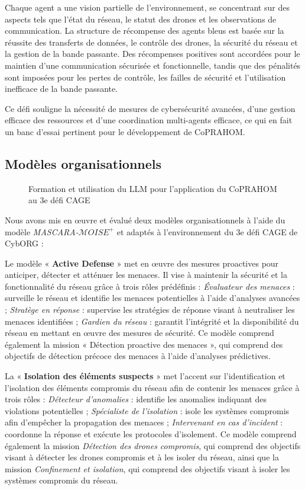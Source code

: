 Chaque agent a une vision partielle de l'environnement, se concentrant sur des aspects tels que l'état du réseau, le statut des drones et les observations de communication. La structure de récompense des agents bleus est basée sur la réussite des transferts de données, le contrôle des drones, la sécurité du réseau et la gestion de la bande passante. Des récompenses positives sont accordées pour le maintien d'une communication sécurisée et fonctionnelle, tandis que des pénalités sont imposées pour les pertes de contrôle, les failles de sécurité et l'utilisation inefficace de la bande passante.

Ce défi souligne la nécessité de mesures de cybersécurité avancées, d'une gestion efficace des ressources et d'une coordination multi-agents efficace, ce qui en fait un banc d'essai pertinent pour le développement de CoPRAHOM.

\subsection{Modèles organisationnels}

\begin{figure}[h!]
    \centering
    
    \caption{Formation et utilisation du LLM pour l'application du CoPRAHOM au 3e défi CAGE}\label{fig:llm_process}
\end{figure}


Nous avons mis en œuvre et évalué deux modèles organisationnels à l'aide du modèle \textit{MASCARA-$\mathcal{M}OISE^+$} et adaptés à l'environnement du 3e défi CAGE de CybORG :

Le modèle « \textbf{Active Defense} » met en œuvre des mesures proactives pour anticiper, détecter et atténuer les menaces. Il vise à maintenir la sécurité et la fonctionnalité du réseau grâce à trois rôles prédéfinis :
%
\textit{Évaluateur des menaces} : surveille le réseau et identifie les menaces potentielles à l'aide d'analyses avancées ;
\textit{Stratège en réponse} : supervise les stratégies de réponse visant à neutraliser les menaces identifiées ;
\textit{Gardien du réseau} : garantit l'intégrité et la disponibilité du réseau en mettant en œuvre des mesures de sécurité.
%
Ce modèle comprend également la mission « Détection proactive des menaces », qui comprend des objectifs de détection précoce des menaces à l'aide d'analyses prédictives.

La « \textbf{Isolation des éléments suspects} » met l'accent sur l'identification et l'isolation des éléments compromis du réseau afin de contenir les menaces grâce à trois rôles :
%
\textit{Détecteur d'anomalies} : identifie les anomalies indiquant des violations potentielles ;
\textit{Spécialiste de l'isolation} : isole les systèmes compromis afin d'empêcher la propagation des menaces ;
\textit{Intervenant en cas d'incident} : coordonne la réponse et exécute les protocoles d'isolement.
%
Ce modèle comprend également la mission \textit{Détection des drones compromis}, qui comprend des objectifs visant à détecter les drones compromis et à les isoler du réseau, ainsi que la mission \textit{Confinement et isolation}, qui comprend des objectifs visant à isoler les systèmes compromis du réseau.

